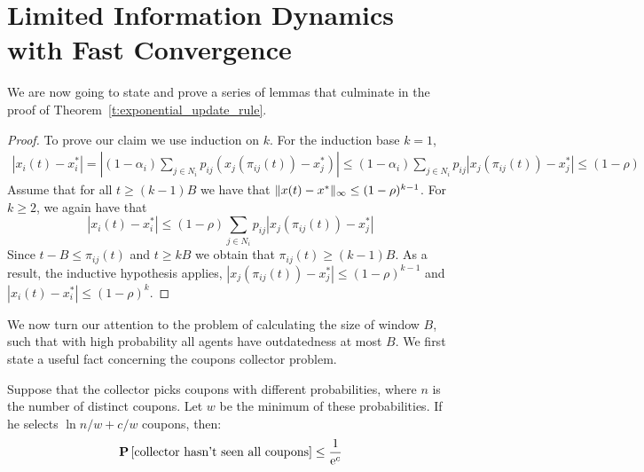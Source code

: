 \section{Limited Information Dynamics with Fast Convergence}\label{app:s:cc_convergence}
We are now going to state and prove a series of lemmas that culminate in
the proof of Theorem~\ref{t:exponential_update_rule}.

\begin{proof}
  To prove our claim we use induction on $k$. For the induction base $k=1$,
  \begin{align*}
    |x_i(t) - x_i^*|
    =
    |(1-\alpha_i)\sum_{j \in N_i}p_{ij}(x_j(\pi_{ij}(t)) -x_j^*)|
    \leq
    (1-\alpha_i)\sum_{j \in N_i}p_{ij}|x_j(\pi_{ij}(t))-x_j^*|\leq (1-\rho)
  \end{align*}
  Assume that for all $t\geq (k-1)B$ we have that $\| x(t)-x^* \|_{\infty}\leq (1-\rho)^{k-1}$.
  For $k\geq 2$, we again have that
  \[|x_i(t) - x_i^*|\leq (1-\rho)\sum_{j \in N_i}p_{ij}|x_j(\pi_{ij}(t))-x_j^*|\]
  Since $t-B \leq \pi_{ij}(t)$ and $t \geq kB$ we obtain that $\pi_{ij}(t) \geq (k-1)B$.
  As a result, the inductive hypothesis applies, $|x_j(\pi_{ij}(t))-x_j^*| \leq (1-\rho)^{k-1}$
  and $|x_i(t) - x_i^*|\leq (1-\rho)^k$.
\end{proof}

We now turn our attention to
the problem of calculating the size of window $B$, such that with high probability
all agents have outdatedness at most $B$.
We first state a useful fact concerning the coupons collector problem.

\begin{lemma}\label{l:coupons_lemma}
Suppose that the collector picks coupons with different
probabilities, where $n$ is the number of distinct coupons.
Let $w$ be the minimum of these probabilities.
If he selects $\ln n/w+ c/w$ coupons, then:
\[
\bm{\mathrm{P}}\left[\text{collector hasn't seen all coupons}\right] \leq \frac{1}{\mathrm{e}^c}
\]
\end{lemma}


